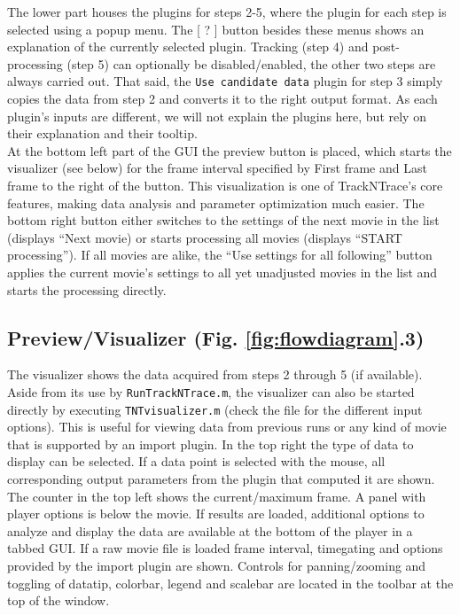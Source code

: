 \documentclass[11pt,onside]{report}
\numberwithin{equation}{chapter}
\begin{document}
The lower part houses the plugins for steps 2-5, where the plugin for each step is selected using a popup menu. The [ \textsf{?} ] button besides these menus shows an explanation of the currently selected plugin. Tracking (step 4) and post-processing (step 5) can optionally be disabled/enabled, the other two steps are always carried out. That said, the \texttt{Use candidate data} plugin for step 3 simply copies the data from step 2 and converts it to the right output format. As each plugin's inputs are different, we will not explain the plugins here, but rely on their explanation and their tooltip. \\

At the bottom left part of the GUI the preview button is placed, which starts the visualizer (see below) for the frame interval specified by   \textsf{First frame} and \textsf{Last frame} to the right of the button. This visualization is one of TrackNTrace's core features, making data analysis and parameter optimization much easier. The bottom right button either switches to the settings of the next movie in the list (displays ``\textsf{Next movie}) or starts processing all movies (displays ``\textsf{START processing}''). If all movies are alike, the ``\textsf{Use settings for all following}'' button applies the current movie's settings to all yet unadjusted movies in the list and starts the processing directly.\\[10pt]

\subsection{Preview/Visualizer (Fig. \ref{fig:flowdiagram}.3)}
The visualizer shows the data acquired from steps 2 through 5 (if available). Aside from its use by \texttt{RunTrackNTrace.m}, the visualizer can also be started directly by executing \texttt{TNTvisualizer.m} (check the file for the different input options). This is useful for viewing data from previous runs or any kind of movie that is supported by an import plugin. In the top right the type of data to display can be selected. If a data point is selected with the mouse, all corresponding output parameters from the plugin that computed it are shown. The counter in the top left shows the current/maximum frame. A panel with player options is below the movie. If results are loaded, additional options to analyze and display the data are available at the bottom of the player in a tabbed GUI. If a raw movie file is loaded frame interval, timegating and options provided by the import plugin are shown. Controls for panning/zooming and toggling of datatip, colorbar, legend and scalebar are located in the toolbar at the top of the window.
\end{document}
